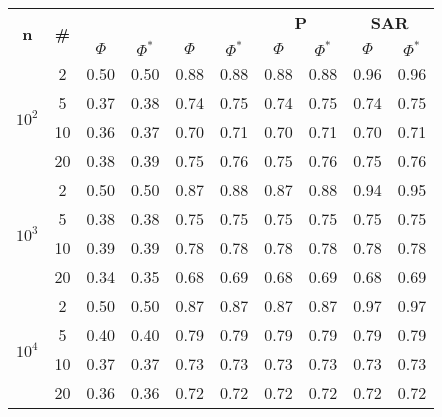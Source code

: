 \begin{table}
\begin{small}
		\bigskip
		\begin{tabular}{|c|c|cc|cc|cc|cc|}
			\hline
			\multirow{2}{*}{\textbf{n}} &
			\multirow{2}{*}{\textbf{\#}} &
			\multicolumn{2}{c|}{\textbf{\astar}} &
			\multicolumn{2}{c|}{\textbf{\ambush}} &
			\multicolumn{2}{c|}{\textbf{P}} &
			\multicolumn{2}{c|}{\textbf{SAR}}\\
			& & $\Phi$ & $\Phi^*$ & $\Phi$ & $\Phi^*$&
			$\Phi$ & $\Phi^*$& $\Phi$ & $\Phi^*$\\
			\hline
			\multirow{4}{*}{$10^2$}
			& 2 & 0.50 & 0.50 & 0.88 & 0.88 & 0.88 & 0.88 & 0.96 & 0.96\\
			& 5 & 0.37 & 0.38 & 0.74 & 0.75 & 0.74 & 0.75 & 0.74 & 0.75\\
			& 10 & 0.36 & 0.37 & 0.70 & 0.71 & 0.70 & 0.71 & 0.70 & 0.71\\
			& 20 & 0.38 & 0.39 & 0.75 & 0.76 & 0.75 & 0.76 & 0.75 & 0.76\\
			\hline
			\multirow{4}{*}{$10^3$}
			& 2 & 0.50 & 0.50 & 0.87 & 0.88 & 0.87 & 0.88 & 0.94 & 0.95\\
			& 5 & 0.38 & 0.38 & 0.75 & 0.75 & 0.75 & 0.75 & 0.75 & 0.75\\
			& 10 & 0.39 & 0.39 & 0.78 & 0.78 & 0.78 & 0.78 & 0.78 & 0.78\\
			& 20 & 0.34 & 0.35 & 0.68 & 0.69 & 0.68 & 0.69 & 0.68 & 0.69\\
			\hline
			\multirow{4}{*}{$10^4$}
			& 2 & 0.50 & 0.50 & 0.87 & 0.87 & 0.87 & 0.87 & 0.97 & 0.97\\
			& 5 & 0.40 & 0.40 & 0.79 & 0.79 & 0.79 & 0.79 & 0.79 & 0.79\\
			& 10 & 0.37 & 0.37 & 0.73 & 0.73 & 0.73 & 0.73 & 0.73 & 0.73\\
			& 20 & 0.36 & 0.36 & 0.72 & 0.72 & 0.72 & 0.72 & 0.72 & 0.72\\
			\hline
		\end{tabular}
	\end{small}
\end{table}
